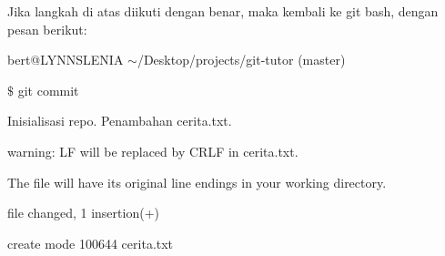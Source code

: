\hspace*{0.50in} Jika langkah di atas diikuti dengan benar, maka kembali ke {\fontsize{11pt}{11pt}\selectfont git bash, dengan pesan berikut:} \par
{\fontsize{10pt}{10pt}\selectfont bert@LYNNSLENIA  $  \sim  $/Desktop/projects/git-tutor (master)} \par
{\fontsize{10pt}{10pt}\selectfont  $  \$  $ git commit} \par
{\fontsize{10pt}{10pt} Inisialisasi repo. Penambahan cerita.txt.} \par
{\fontsize{10pt}{10pt}\selectfont warning: LF will be replaced by CRLF in cerita.txt.} \par
{\fontsize{10pt}{10pt}\selectfont The file will have its original line endings in your working directory.} \par
{\fontsize{10pt}{10pt} file changed, 1 insertion(+)} \par
{\fontsize{10pt}{10pt}\selectfont  create mode 100644 cerita.txt} \par
\vspace{8pt}

